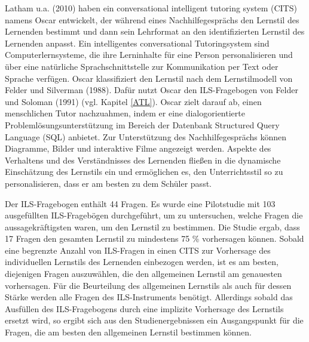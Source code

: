         Latham u.a. (2010) haben ein conversational intelligent tutoring system (CITS)  namens Oscar entwickelt, der während eines Nachhilfegesprächs den Lernstil des Lernenden bestimmt und dann sein Lehrformat
        an den identifizierten Lernstil des Lernenden anpasst.
        Ein  intelligentes conversational Tutoringsystem sind Computerlernsysteme, die ihre Lerninhalte für eine Person personalisieren und über eine 
        natürliche Sprachschnittstelle zur Kommunikation per Text oder Sprache verfügen.
        Oscar klassifiziert den Lernstil nach dem Lernstilmodell 
        von Felder und Silverman (1988). Dafür nutzt Oscar den ILS-Fragebogen von Felder und Soloman (1991) (vgl. Kapitel \ref{ATL}).
        Oscar zielt darauf ab, einen menschlichen Tutor nachzuahmen, 
        indem er eine dialogorientierte Problemlösungsunterstützung im Bereich der 
        Datenbank Structured Query Language (SQL) anbietet.
        Zur Unterstützung des Nachhilfegesprächs können Diagramme, Bilder und interaktive Filme angezeigt werden. Aspekte des Verhaltens 
        und des Verständnisses des Lernenden fließen in die dynamische Einschätzung
        des Lernstils ein und ermöglichen es, den Unterrichtsstil so zu personalisieren, dass er am besten zu dem Schüler passt.
        \parencite[4]{Oscar}

        Der ILS-Fragebogen enthält 44 Fragen. Es wurde eine Pilotstudie mit 103 ausgefüllten ILS-Fragebögen durchgeführt,
        um zu untersuchen, welche Fragen die aussagekräftigsten waren, um den Lernstil zu bestimmen. 
        Die Studie ergab, dass 17 Fragen den gesamten Lernstil zu mindestens 75 \% vorhersagen können. 
        Sobald eine begrenzte Anzahl von ILS-Fragen in einen CITS zur Vorhersage des individuellen Lernstils des Lernenden 
        einbezogen werden, ist es am besten, diejenigen Fragen auszuwählen, die den allgemeinen Lernstil am genauesten vorhersagen.
        Für die Beurteilung des allgemeinen Lernstils als auch für dessen Stärke werden alle Fragen des ILS-Instruments benötigt.
        Allerdings sobald das Ausfüllen des ILS-Fragebogens
        durch eine implizite Vorhersage des Lernstils ersetzt wird, so ergibt sich aus den Studienergebnissen ein Ausgangspunkt für die Fragen, die am besten 
        den allgemeinen Lernstil bestimmen können. \parencite[51 f.]{Latham.2011}
        
